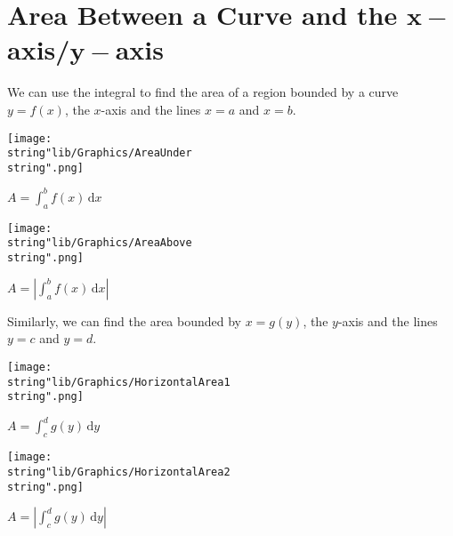 \documentclass[11pt,a4paper]{book}
\begin{document}
\newpage{}

\section{Area Between a Curve and the $\boldsymbol{x-}$axis/$\boldsymbol{y-}$axis}

We can use the integral to find the area of a region bounded by a
curve $y=f(x)$, the $x$-axis and the lines $x=a$ and $x=b$.

\begin{minipage}[t]{.5\textwidth}
\begin{center}
\texttt{[image: \\string"lib/Graphics/AreaUnder\\string".png]}
\par\end{center}

\begin{center}
${\displaystyle A=\int_{a}^{b}f(x)\,\mathrm{d}x}$
\par\end{center}

\end{minipage}
\begin{minipage}[t]{.5\textwidth}
\begin{center}
\texttt{[image: \\string"lib/Graphics/AreaAbove\\string".png]}
\par\end{center}

\begin{center}
${\displaystyle A=\left|\int_{a}^{b}f(x)\,\mathrm{d}x\right|}$
\par\end{center}

\end{minipage}

Similarly, we can find the area bounded by $x=g(y)$, the $y$-axis
and the lines $y=c$ and $y=d$.

\begin{minipage}[t]{.5\textwidth}
\begin{center}
\texttt{[image: \\string"lib/Graphics/HorizontalArea1\\string".png]}
\par\end{center}

\begin{center}
${\displaystyle A=\int_{c}^{d}g(y)\,\mathrm{d}y}$
\par\end{center}

\end{minipage}
\begin{minipage}[t]{.5\textwidth}
\begin{center}
\texttt{[image: \\string"lib/Graphics/HorizontalArea2\\string".png]}
\par\end{center}

\begin{center}
${\displaystyle A=\left|\int_{c}^{d}g(y)\,\mathrm{d}y\right|}$
\par\end{center}

\end{minipage}
\end{document}
